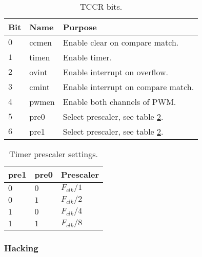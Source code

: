 \begin{table}[h]
    \centering
    \begin{tabular}{|l|l|l|}
        \hline
        \textbf{Bit} & \textbf{Name} & \textbf{Purpose}                                               \\ \hline
        $0$          & ccmen         & Enable clear on compare match.                                 \\ \hline
        $1$          & timen         & Enable timer.                                                  \\ \hline
        $2$          & ovint         & Enable interrupt on overflow.                                  \\ \hline
        $3$          & cmint         & Enable interrupt on compare match.                             \\ \hline
        $4$          & pwmen         & Enable both channels of PWM.                                   \\ \hline
        $5$          & pre0          & Select prescaler, see table \ref{tab:tim_prescaler_setting}.   \\ \hline
        $6$          & pre1          & Select prescaler, see table \ref{tab:tim_prescaler_setting}.   \\ \hline
    \end{tabular}
    \caption{TCCR bits.}
    \label{tab:tim_tccr_bits}
\end{table}

\begin{table}[h]
    \centering
    \begin{tabular}{|l|l|l|}
        \hline
        \textbf{pre1} & \textbf{pre0} & \textbf{Prescaler} \\ \hline
        $0$ & $0$ & $F_{clk}/1$ \\ \hline
        $0$ & $1$ & $F_{clk}/2$ \\ \hline
        $1$ & $0$ & $F_{clk}/4$ \\ \hline
        $1$ & $1$ & $F_{clk}/8$ \\ \hline
    \end{tabular}
    \caption{Timer prescaler settings.}
    \label{tab:tim_prescaler_setting}
\end{table}

\subsubsection{Hacking}

